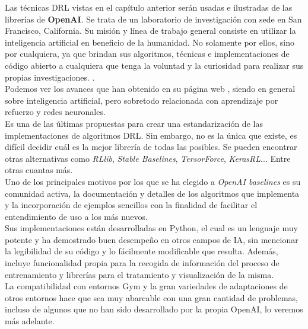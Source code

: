 \documentclass[11pt,fleqn]{book} %
\begin{document}
Las técnicas DRL vistas en el capítulo anterior serán usadas e ilustradas de las librerías de \textbf{OpenAI}. Se trata de un laboratorio de investigación con sede en San Francisco, California. Su misión y línea de trabajo general consiste en utilizar la inteligencia artificial en beneficio de la humanidad. No solamente por ellos, sino por cualquiera, ya que brindan sus algoritmos, técnicas e implementaciones de código abierto a cualquiera que tenga la voluntad y la curiosidad para realizar sus propias investigaciones. \cite{article:openAI}. \\

Podemos ver los avances que han obtenido en su página web \cite{article:openAI2}, siendo en general sobre inteligencia artificial, pero sobretodo relacionada con aprendizaje por refuerzo y redes neuronales.\\


Es una de las últimas propuestas para crear una estandarización de las implementaciones de algoritmos DRL. Sin embargo, no es la única que existe, es difícil decidir cuál es la mejor librería de todas las posibles. Se pueden encontrar otras alternativas como \textit{RLlib}, \textit{Stable Baselines}, \textit{TersorForce}, \textit{KerasRL}... Entre otras cuantas más. \\

Uno de los principales motivos por los que se ha elegido a \textit{OpenAI baselines} es su comunidad activa, la documentación y detalles de los algoritmos que implementa y la incorporación de ejemplos sencillos con la finalidad de facilitar el entendimiento de uso a los más nuevos. \\

Sus implementaciones están desarrolladas en Python, el cual es un lenguaje muy potente y ha demostrado buen desempeño en otros campos de IA, sin mencionar la legibilidad de su código y lo fácilmente modificable que resulta. Además, incluye funcionalidad propia para la recogida de información del proceso de entrenamiento y librerías para el tratamiento y visualización de la misma. \\

La compatibilidad con entornos Gym y la gran variedades de adaptaciones de otros entornos hace que sea muy abarcable con una gran cantidad de problemas, incluso de algunos que no han sido desarrollado por la propia OpenAI, lo veremos más adelante. \\
\end{document}
